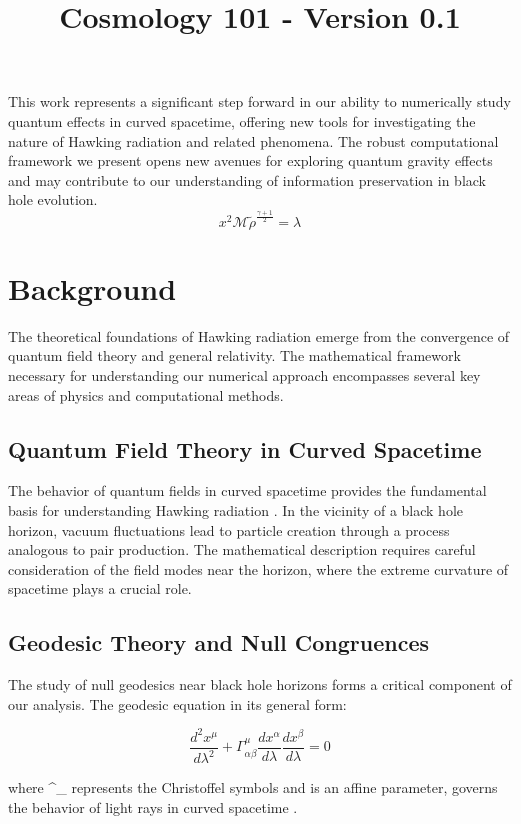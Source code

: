 \documentclass{article}\usepackage{graphicx} \usepackage{amsmath} \usepackage{colortbl}\title{Cosmology 101 - Version 0.1}
\begin{document}
This work represents a significant step forward in our ability to numerically study quantum effects in curved spacetime, offering new tools for investigating the nature of Hawking radiation and related phenomena. The robust computational framework we present opens new avenues for exploring quantum gravity effects and may contribute to our understanding of information preservation in black hole evolution.
 \begin{equation}x^2 \mathcal{M} \tilde{\rho }^{\frac{\gamma +1}{2}}=\lambda \label{Mi ecuacion 8} \end{equation}\section{Background}
The theoretical foundations of Hawking radiation emerge from the convergence of quantum field theory and general relativity. The mathematical framework necessary for understanding our numerical approach encompasses several key areas of physics and computational methods.

\subsection{Quantum Field Theory in Curved Spacetime}
The behavior of quantum fields in curved spacetime provides the fundamental basis for understanding Hawking radiation \cite{hawking1975}. In the vicinity of a black hole horizon, vacuum fluctuations lead to particle creation through a process analogous to pair production. The mathematical description requires careful consideration of the field modes near the horizon, where the extreme curvature of spacetime plays a crucial role.

\subsection{Geodesic Theory and Null Congruences}
The study of null geodesics near black hole horizons forms a critical component of our analysis. The geodesic equation in its general form:

\begin{equation}
\frac{d^2x^\mu}{d\lambda^2} + \Gamma^\mu_{\alpha\beta}\frac{dx^\alpha}{d\lambda}\frac{dx^\beta}{d\lambda} = 0
\end{equation}

where \Gamma^\mu_{\alpha\beta} represents the Christoffel symbols and \lambda is an affine parameter, governs the behavior of light rays in curved spacetime \cite{parker1969}.
\end{document}
